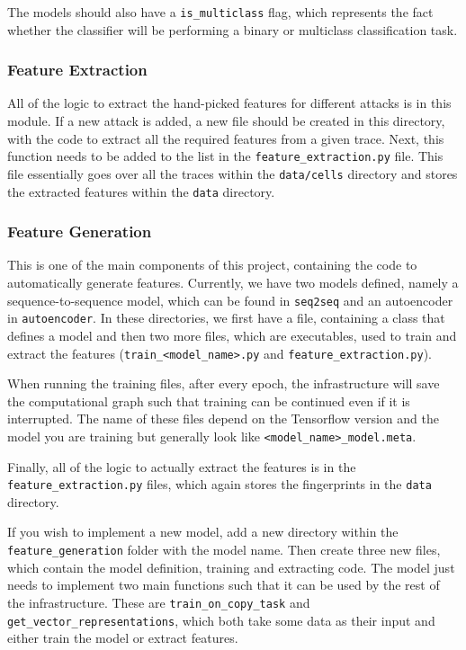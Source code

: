 The models should also have a \texttt{is\_multiclass} flag, which represents the fact whether the classifier will be performing a binary or multiclass classification task.

\subsubsection{Feature Extraction}

All of the logic to extract the hand-picked features for different attacks is in this module.
If a new attack is added, a new file should be created in this directory, with the code to extract all the required features from a given trace.
Next, this function needs to be added to the list in the \texttt{feature\_extraction.py} file.
This file essentially goes over all the traces within the \texttt{data/cells} directory and stores the extracted features within the \texttt{data} directory.

\subsubsection{Feature Generation}

This is one of the main components of this project, containing the code to automatically generate features.
Currently, we have two models defined, namely a sequence-to-sequence model, which can be found in \texttt{seq2seq} and an autoencoder in \texttt{autoencoder}.
In these directories, we first have a file, containing a class that defines a model and then two more files, which are executables, used to train and extract the features (\texttt{train\_<model\_name>.py} and \texttt{feature\_extraction.py}).

When running the training files, after every epoch, the infrastructure will save the computational graph such that training can be continued even if it is interrupted.
The name of these files depend on the Tensorflow version and the model you are training but generally look like \texttt{<model\_name>\_model.meta}.

Finally, all of the logic to actually extract the features is in the \texttt{feature\_extraction.py} files, which again stores the fingerprints in the \texttt{data} directory.

If you wish to implement a new model, add a new directory within the \texttt{feature\_generation} folder with the model name.
Then create three new files, which contain the model definition, training and extracting code.
The model  just needs to implement two main functions such that it can be used by the rest of the infrastructure.
These are \texttt{train\_on\_copy\_task} and \texttt{get\_vector\_representations}, which both take some data as their input and either train the model or extract features.

